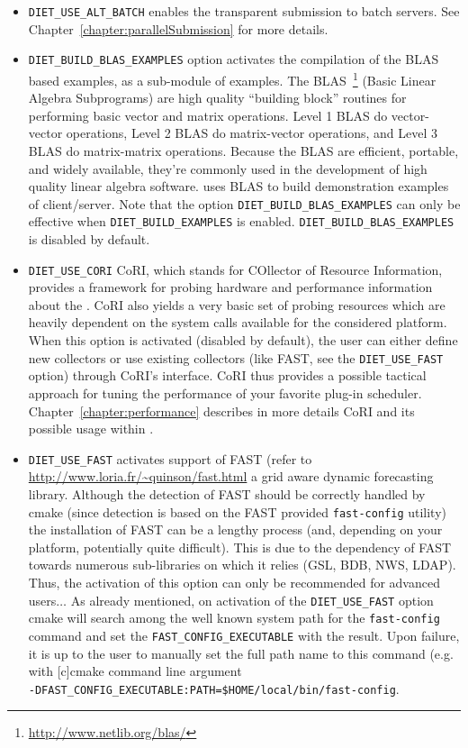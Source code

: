 \begin{itemize}
\item
  \verb+DIET_USE_ALT_BATCH+ enables the transparent submission to
  batch servers. See Chapter~\ref{chapter:parallelSubmission} for more
  details.

\item
  \verb+DIET_BUILD_BLAS_EXAMPLES+ option activates the compilation of
  the BLAS based \diet examples, as a sub-module of examples.  The
  BLAS~\footnote{\url{http://www.netlib.org/blas/}} (Basic Linear
  Algebra Subprograms) are high quality ``building block'' routines
  for performing basic vector and matrix operations.  Level 1 BLAS do
  vector-vector operations, Level 2 BLAS do matrix-vector operations,
  and Level 3 BLAS do matrix-matrix operations.  Because the BLAS are
  efficient, portable, and widely available, they're commonly used in
  the development of high quality linear algebra software. \diet uses
  BLAS to build demonstration examples of client/server.  Note that
  the option \verb+DIET_BUILD_BLAS_EXAMPLES+ can only be effective
  when \verb+DIET_BUILD_EXAMPLES+ is enabled.
  \verb+DIET_BUILD_BLAS_EXAMPLES+ is disabled by default.

\item
  \verb+DIET_USE_CORI+ CoRI, which stands for COllector of Resource
  Information, provides a framework for probing hardware and
  performance information about the \sed. CoRI also yields a very
  basic set of probing resources which are heavily dependent on the
  system calls available for the considered platform.  When this
  option is activated (disabled by default), the user can either
  define new collectors or use existing collectors (like FAST, see the
  \verb+DIET_USE_FAST+ option) through CoRI's interface. CoRI thus
  provides a possible tactical approach for tuning the performance of
  your favorite plug-in scheduler.  Chapter~\ref{chapter:performance}
  describes in more details CoRI and its possible usage within \diet.

\item
  \verb+DIET_USE_FAST+ activates \diet support of FAST (refer to
  \url{http://www.loria.fr/~quinson/fast.html} a grid aware dynamic
  forecasting library. Although the detection of FAST should be
  correctly handled by cmake (since detection is based on the FAST
  provided \verb+fast-config+ utility) the installation of FAST can be
  a lengthy process (and, depending on your platform, potentially
  quite difficult). This is due to the dependency of FAST towards
  numerous sub-libraries on which it relies (GSL, BDB, NWS, LDAP).
  Thus, the activation of this option can only be recommended for
  advanced users$\ldots$ As already mentioned, on activation of the
  \verb+DIET_USE_FAST+ option cmake will search among the well known
  system path for the \verb+fast-config+ command and set the
  \verb+FAST_CONFIG_EXECUTABLE+ with the result. Upon failure, it is
  up to the user to manually set the full path name to this command
  (e.g. with [c]cmake command line argument
  \\ \verb+-DFAST_CONFIG_EXECUTABLE:PATH=$HOME/local/bin/fast-config+.


\end{itemize}
